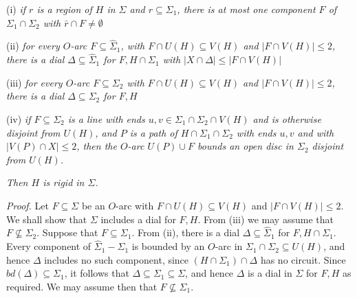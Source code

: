 \hspace*{12pt}(i) \textit{if $r$ is a region of $H$ in $\Sigma$ and $r \subseteq \Sigma_1$, there is at most one component $F$ of $\Sigma_1 \cap \Sigma_2$ with $\bar{r} \cap F \ne \emptyset$}

\hspace*{12pt}(ii) \textit{for every $O$-arc $F \subseteq \hat{\Sigma}_1$, with $F \cap U(H) \subseteq V(H)$ and $|F \cap V(H)| \le 2$, there is a dial $\Delta \subseteq \hat{\Sigma}_1$ for $F, H \cap \Sigma_1$ with $|X \cap \Delta| \le |F \cap V(H)|$}

\hspace*{12pt}(iii) \textit{for every $O$-arc $F \subseteq \Sigma_2$ with $F \cap U(H) \subseteq V(H)$ and $|F \cap V(H)| \le 2$, there is a dial $\Delta \subseteq \Sigma_2$ for $F, H$}

\hspace*{12pt}(iv) \textit{if $F \subseteq \Sigma_2$ is a line with ends $u, v \in \Sigma_1 \cap \Sigma_2 \cap V(H)$ and is otherwise disjoint from $U(H)$, and $P$ is a path of $H \cap \Sigma_1 \cap \Sigma_2$ with ends $u, v$ and with $|V(P) \cap X| \le 2$, then the $O$-arc $U(P) \cup F$ bounds an open disc in $\Sigma_2$ disjoint from $U(H)$.}

\textit{Then $H$ is rigid in $\Sigma$.}

\textit{Proof.} Let $F \subseteq \Sigma$ be an $O$-arc with $F \cap U(H) \subseteq V(H)$ and $|F \cap V(H)| \le 2$. We shall show that $\Sigma$ includes a dial for $F, H$. From (iii) we may assume that $F \not\subseteq \Sigma_2$. Suppose that $F \subseteq \Sigma_1$. From (ii), there is a dial $\Delta \subseteq \hat{\Sigma}_1$ for $F, H \cap \Sigma_1$. Every component of $\hat{\Sigma}_1 - \Sigma_1$ is bounded by an $O$-arc in $\Sigma_1 \cap \Sigma_2 \subseteq U(H)$, and hence $\Delta$ includes no such component, since $(H \cap \Sigma_1) \cap \Delta$ has no circuit. Since $bd(\Delta) \subseteq \Sigma_1$, it follows that $\Delta \subseteq \Sigma_1 \subseteq \Sigma$, and hence $\Delta$ is a dial in $\Sigma$ for $F, H$ as required. We may assume then that $F \not\subseteq \Sigma_1$.

